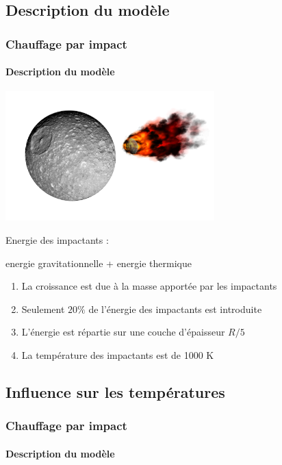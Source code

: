 \documentclass{beamer}
\begin{document}
\subsection{Description du modèle}

\begin{frame}
	\frametitle{Chauffage par impact}
	\framesubtitle{Description du modèle}
	
\vspace{-0.3cm}
\center \includegraphics[height = 5cm]{figures/impact.pdf}  

\vspace{-0.5cm}
Energie des impactants : 

energie gravitationnelle + energie thermique
\vspace{0.3cm}

\begin{enumerate}
\item La croissance est due à la masse apportée par les impactants
\item Seulement $20\%$ de l'énergie des impactants est introduite
\item L'énergie est répartie sur une couche d'épaisseur $R/5$
\item La température des impactants est de 1000 K 
\end{enumerate}
\end{frame}

\subsection{Influence sur les températures}

\begin{frame}
	\frametitle{Chauffage par impact}
	\framesubtitle{Description du modèle}
	
\end{frame}
\end{document}
